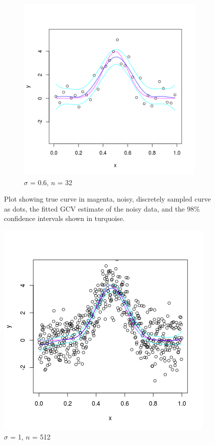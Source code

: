\documentclass[11pt]{article}
\begin{document}
\begin{homeworkProblem}
\begin{figure}[!ht]
\begin{subfigure}{0.5\textwidth}
\begin{centering}
                \includegraphics[width=\linewidth]{smooth_sig06_n32.png}
                \caption{$\sigma$ = 0.6, $n$ = 32}
            \end{centering}
        \end{subfigure}

        \caption{Plot showing true curve in magenta, noisy, discretely sampled
            curve as dots, the fitted GCV estimate of the noisy data, and the
            98\% confidence intervals shown in turquoise.}
    \end{figure}

    \begin{figure}[!ht]
        \begin{centering}
            \includegraphics[width=0.5\linewidth]{smooth_sig1_n512.png}
            \caption{$\sigma$ = 1, $n$ = 512}
        \end{centering}
    \end{figure}


\end{homeworkProblem}
\end{document}
